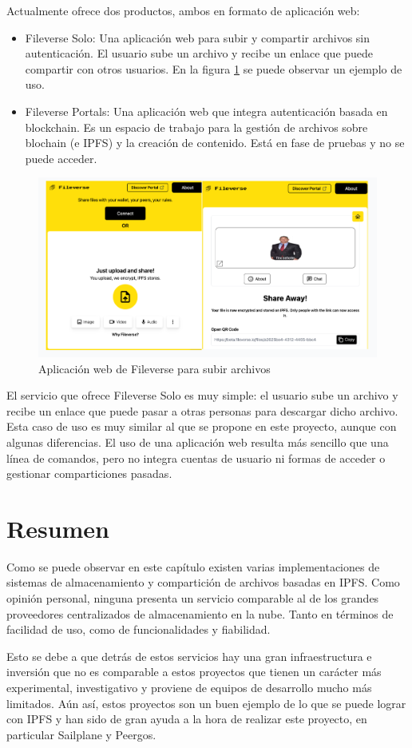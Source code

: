 Actualmente ofrece dos productos, ambos en formato de aplicación web:
\begin{itemize}
    \item Fileverse Solo: Una aplicación web para subir y compartir archivos sin autenticación. El usuario sube un archivo y recibe un enlace que puede compartir con otros usuarios. En la figura \ref{fig:fileverse} se puede observar un ejemplo de uso.
    \item Fileverse Portals: Una aplicación web que integra autenticación basada en blockchain. Es un espacio de trabajo para la gestión de archivos sobre blochain (e IPFS) y la creación de contenido. Está en fase de pruebas y no se puede acceder.
\end{itemize}
\begin{figure}[H]
    \centering
    \small
    \includegraphics[width=\linewidth]{images/fileverse.png}
    \caption{Aplicación web de Fileverse para subir archivos}
    \label{fig:fileverse}
\end{figure}

El servicio que ofrece Fileverse Solo es muy simple: el usuario sube un archivo y recibe un enlace que puede pasar a otras personas para descargar dicho archivo.
Esta caso de uso es muy similar al que se propone en este proyecto, aunque con algunas diferencias. El uso de una
aplicación web resulta más sencillo que una línea de comandos, pero no integra cuentas de usuario ni formas de acceder o gestionar comparticiones pasadas.


\section{Resumen}

Como se puede observar en este capítulo existen varias implementaciones de sistemas de almacenamiento y compartición de
archivos basadas en IPFS. Como opinión personal, ninguna presenta un servicio comparable al de los grandes
proveedores centralizados de almacenamiento en la nube. Tanto en términos de facilidad de uso, como de funcionalidades y
fiabilidad.

Esto se debe a que detrás de estos servicios hay una gran infraestructura e inversión que no es comparable a estos proyectos
que tienen un carácter más experimental, investigativo y proviene de equipos de desarrollo mucho más limitados. Aún así, estos proyectos son un buen ejemplo de lo que se puede lograr con IPFS y
han sido de gran ayuda a la hora de realizar este proyecto, en particular Sailplane y Peergos.
